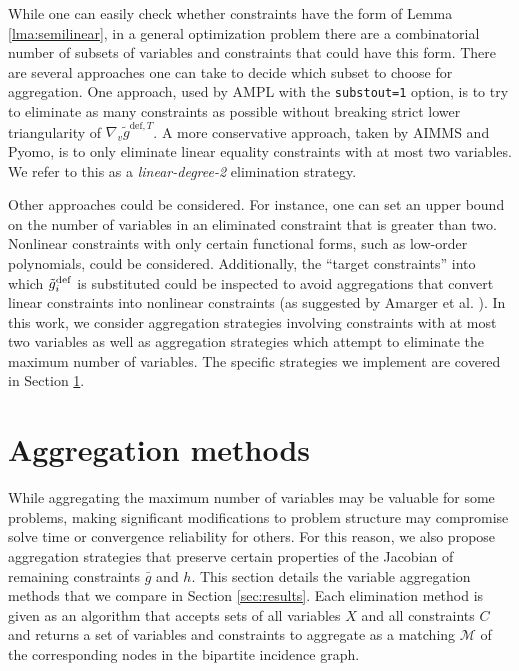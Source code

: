 \documentclass[smallextended]{svjour3}
\begin{document}
While one can easily check whether constraints have the form
of Lemma \ref{lma:semilinear},
in a general optimization problem there are a combinatorial number
of subsets of variables and constraints that could have this form.
There are several approaches one can take to decide which subset to choose
for aggregation. One approach, used by AMPL with the {\tt substout=1} option,
is to try to eliminate as many constraints as possible without breaking
strict lower triangularity of $\nabla_v \tilde g^{\mathrm{def},T}$.
A more conservative approach, taken by AIMMS and Pyomo, is to only eliminate
linear equality constraints with at most two variables.
We refer to this as a {\it linear-degree-2} elimination strategy.

Other approaches could be considered. For instance, one can set an upper bound
on the number of variables in an eliminated constraint that is greater than two.
Nonlinear constraints with only certain functional forms, such as low-order
polynomials, could be considered. Additionally, the ``target constraints''
into which $\tilde g^{\rm def}_i$ is substituted could be inspected to avoid
aggregations that convert linear constraints into nonlinear constraints
(as suggested by Amarger et al. \cite{amarger1992}).
In this work, we consider aggregation strategies involving constraints with
at most two variables as well as aggregation strategies which attempt to eliminate
the maximum number of variables. The specific strategies we implement
are covered in Section \ref{sec:methods}.

\section{Aggregation methods}
\label{sec:methods}

While aggregating the maximum number of variables may be valuable for some
problems, making significant modifications to problem structure may
compromise solve time or convergence reliability for others.
For this reason, we also propose aggregation strategies that preserve certain
properties of the Jacobian of remaining constraints $\bar g$ and $h$.
This section details the variable aggregation methods that we compare in
Section \ref{sec:results}. Each elimination method is given as an algorithm
that accepts sets of all variables $X$ and all constraints $C$ and returns
a set of variables and constraints to aggregate as a matching $\mathcal{M}$
of the corresponding nodes in the bipartite incidence graph.
\end{document}
